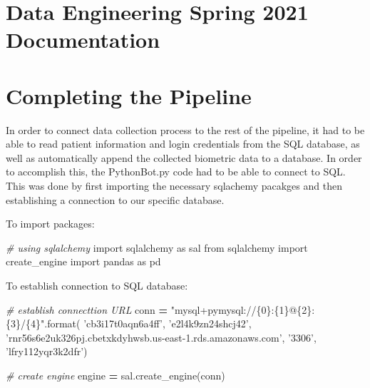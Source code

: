 \documentclass[]{book}
\newenvironment{Shaded}{\begin{snugshade}}{\end{snugshade}}
\newcommand{\BuiltInTok}[1]{#1}
\newcommand{\CommentTok}[1]{\textcolor[rgb]{0.56,0.35,0.01}{\textit{#1}}}
\newcommand{\ImportTok}[1]{#1}
\newcommand{\NormalTok}[1]{#1}
\newcommand{\OperatorTok}[1]{\textcolor[rgb]{0.81,0.36,0.00}{\textbf{#1}}}
\newcommand{\SpecialCharTok}[1]{\textcolor[rgb]{0.00,0.00,0.00}{#1}}
\newcommand{\StringTok}[1]{\textcolor[rgb]{0.31,0.60,0.02}{#1}}
\begin{document}
\hypertarget{data-engineering-spring-2021-documentation}{%
\section{Data Engineering Spring 2021 Documentation}\label{data-engineering-spring-2021-documentation}}

\hypertarget{completing-the-pipeline}{%
\section{Completing the Pipeline}\label{completing-the-pipeline}}

In order to connect data collection process to the rest of the pipeline, it had to be able to read patient information and login credentials from the SQL database, as well as automatically append the collected biometric data to a database. In order to accomplish this, the PythonBot.py code had to be able to connect to SQL. This was done by first importing the necessary sqlachemy pacakges and then establishing a connection to our specific database.

To import packages:

\begin{Shaded}
\begin{Highlighting}[]
\CommentTok{# using sqlalchemy}
\ImportTok{import}\NormalTok{ sqlalchemy }\ImportTok{as}\NormalTok{ sal}
\ImportTok{from}\NormalTok{ sqlalchemy }\ImportTok{import}\NormalTok{ create_engine}
\ImportTok{import}\NormalTok{ pandas }\ImportTok{as}\NormalTok{ pd}
\end{Highlighting}
\end{Shaded}

To establish connection to SQL database:

\begin{Shaded}
\begin{Highlighting}[]
\CommentTok{# establish connecttion URL}
\NormalTok{conn }\OperatorTok{=} \StringTok{"mysql+pymysql://}\SpecialCharTok{\{0\}}\StringTok{:}\SpecialCharTok{\{1\}}\StringTok{@}\SpecialCharTok{\{2\}}\StringTok{:}\SpecialCharTok{\{3\}}\StringTok{/}\SpecialCharTok{\{4\}}\StringTok{"}\NormalTok{.}\BuiltInTok{format}\NormalTok{(}
    \StringTok{'cb3i17t0aqn6a4ff'}\NormalTok{, }\StringTok{'e2l4k9zn24shcj42'}\NormalTok{, }\StringTok{'rnr56s6e2uk326pj.cbetxkdyhwsb.us-east-1.rds.amazonaws.com'}\NormalTok{, }\StringTok{'3306'}\NormalTok{, }\StringTok{'lfry112yqr3k2dfr'}\NormalTok{)}
 
\CommentTok{# create engine}
\NormalTok{engine }\OperatorTok{=}\NormalTok{ sal.create_engine(conn)}
\end{Highlighting}
\end{Shaded}
\end{document}
